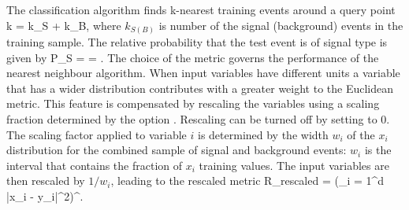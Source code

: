 The classification algorithm finds k-nearest training events around a query point
\beq
   k = k_{S} + k_{B}\;,
\eeq
where $k_{S(B)}$ is number of the signal (background) events in the training sample. 
The relative probability that the test event is of signal type is given by
\beq
   P_{S} =  = \;.
\eeq
The choice of the metric governs the performance of the nearest neighbour algorithm. 
When input variables have different units a variable that has a wider distribution 
contributes with a greater weight to the Euclidean metric. This feature is compensated 
by rescaling the variables using a scaling fraction determined by the option .
Rescaling can be turned off by setting  to 0. The scaling factor applied
to variable $i$ is determined by the width $w_{i}$ of the $x_{i}$ distribution for the 
combined sample of signal and background events: $w_{i}$ is the interval that contains 
the fraction  of $x_{i}$ training values. The input variables are 
then rescaled by $1/w_{i}$, leading to the rescaled metric
\beq
   R_{\rm rescaled} = 
   \left(\sum_{i = 1}^{d} |x_{i} - y_{i}|^{2}\right)^{\!\!}\;. 
\eeq
